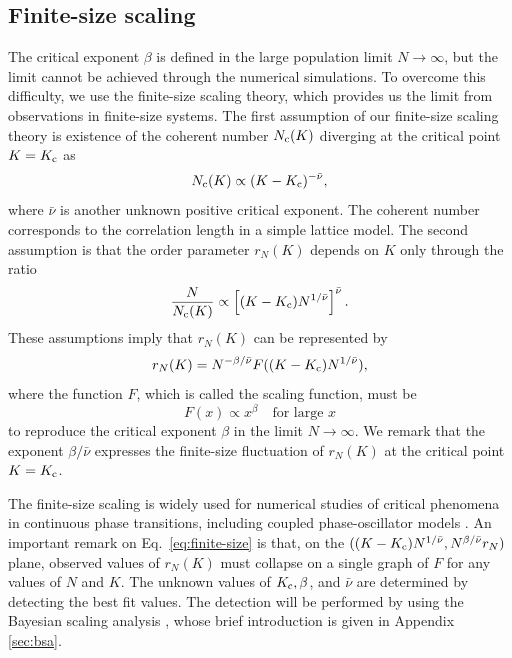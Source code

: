 \subsection{Finite-size scaling}
The critical exponent $\beta$ is defined in the large population limit
$N\to\infty$, but the limit cannot be achieved through the numerical
simulations. To overcome this difficulty, we use the finite-size
scaling theory, which provides us the limit from observations
in finite-size systems.
The first assumption of our finite-size scaling theory is
existence of the coherent number $N_{\rm c}(K)$ \cite{botet1982} diverging at
the critical point $K=K_{\rm c}$ as
\begin{equation}
  N_{\rm c}(K) \propto (K-K_{\rm c})^{-\bar{\nu}},
\end{equation}
where $\bar{\nu}$ is another unknown positive critical exponent.
The coherent number corresponds to the correlation length
in a simple lattice model.
The second assumption is that the order parameter $r_{N}(K)$
depends on $K$ only through the ratio
\begin{equation}
  \dfrac{N}{N_{\rm c}(K)} \propto \left[ (K-K_{\rm c})N^{1/\bar{\nu}} \right]^{\bar{\nu}}.
\end{equation}
These assumptions imply that $r_{N}(K)$ can be represented by
\begin{equation}
  \label{eq:finite-size}
  r_{N}(K) = N^{-\beta/\bar{\nu}} F((K-K_{\rm c})N^{1/\bar{\nu}}),
\end{equation}
where the function $F$, which is called the scaling function, must be
\begin{equation}
  F(x) \propto x^{\beta} \quad \text{for large } x
\end{equation}
to reproduce the critical exponent $\beta$ in the limit $N\to\infty$.
We remark that the exponent $\beta/\bar{\nu}$ expresses
the finite-size fluctuation of $r_{N}(K)$
at the critical point $K=K_{\rm c}$.

The finite-size scaling is widely used for numerical studies
of critical phenomena in continuous phase transitions,
including coupled phase-oscillator models \cite{hong2002,pelissetto2002,hasenbusch2010,pikovsky2015,hong2015,coletta2017,juhasz2019}.
An important remark on Eq.~\eqref{eq:finite-size} is that,
on the $((K-K_{\rm c})N^{1/\bar{\nu}}, N^{\beta/\bar{\nu}}r_{N})$ plane,
observed values of $r_{N}(K)$ must collapse on a single graph of $F$
for any values of $N$ and $K$.
The unknown values of $K_{\rm c}, \beta$, and $\bar{\nu}$
are determined by detecting the best fit values.
The detection will be performed by using the Bayesian scaling analysis
\cite{harada2011,harada2015},
whose brief introduction is given in Appendix \ref{sec:bsa}.


